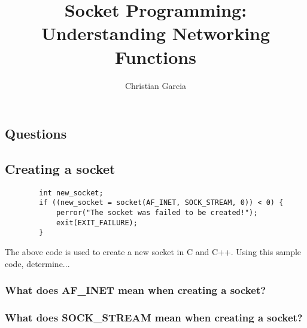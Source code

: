 \documentclass{article}
\title{Socket Programming: Understanding Networking Functions}
\author{Christian Garcia}
\begin{document}
	\maketitle
	
	
	\begin{Huge}
		\section{Questions}
	\end{Huge}
	
	\begin{Large}
		\subsection{\textbf{Creating a socket}}
	\end{Large}
	
	\begin{lstlisting}
		int new_socket;
		if ((new_socket = socket(AF_INET, SOCK_STREAM, 0)) < 0) {
			perror("The socket was failed to be created!");
			exit(EXIT_FAILURE);
		}		
	\end{lstlisting}
	The above code is used to create a new socket in C and C++. Using this sample code, determine...
	\subsubsection{What does AF\_INET mean when creating a socket?}
	\vspace{72pt}
	\subsubsection{What does SOCK\_STREAM mean when creating a socket?}
	
		
		
\end{document}
